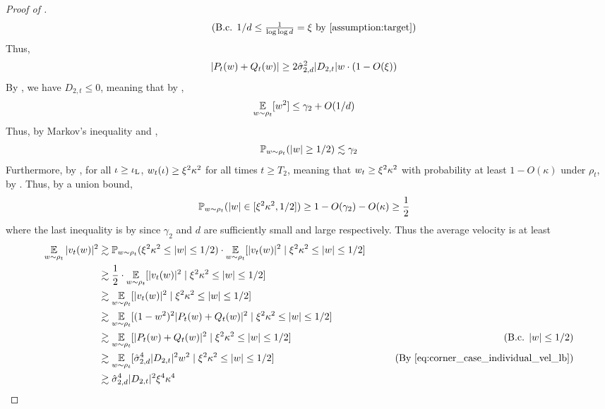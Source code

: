 \begin{proof}[Proof of ]
\begin{align}
& \tag{B.c. $1/d \leq \frac{1}{\log \log d} = \xi$ by \Cref{assumption:target}}
\end{align}
Thus,
\begin{align} \label{eq:corner_case_individual_vel_lb}
|P_t(w) + Q_t(w)|
& \geq 2 \hat{\sigma}_{2, d}^2 |D_{2, t}| w \cdot (1 - O(\xi))
\end{align}
By , we have $D_{2, t} \leq 0$, meaning that by ,
\begin{align}
\operatorname*{\mathbb{E}}_{w \sim \rho_t}[w^2] 
& \leq \gamma_2 + O(1/d)
\end{align}
Thus, by Markov's inequality and ,
\begin{align}
\mathbb{P}_{w \sim \rho_t}(|w| \geq 1/2) 
\lesssim \gamma_2
\end{align}
Furthermore, by , for all $\iota \geq \iota_{\textup{L}}$, $w_t(\iota) \geq \xi^2 \kappa^2$ for all times $t \geq T_2$, meaning that $w_t \geq \xi^2 \kappa^2$ with probability at least $1 - O(\kappa)$ under $\rho_t$, by . Thus, by a union bound,
\begin{align}
\mathbb{P}_{w \sim \rho_t}(|w| \in [\xi^2 \kappa^2, 1/2])
& \geq 1 - O(\gamma_2) - O(\kappa) \geq \frac{1}{2}
\end{align}
where the last inequality is by  since $\gamma_2$ and $d$ are sufficiently small and large respectively. Thus the average velocity is at least
\begin{align}
\E_{\w \sim \rho_t} |\vel_t(\w)|^2
& \gtrsim \Prob_{\w \sim \rho_t}(\xi^2 \kappa^2 \leq |\w| \leq 1/2) \cdot \E_{\w \sim \rho_t} [|\vel_t(\w)|^2 \mid \xi^2 \kappa^2 \leq |\w| \leq 1/2] \\
& \gtrsim \frac{1}{2} \cdot \E_{\w \sim \rho_t} [|\vel_t(\w)|^2 \mid \xi^2 \kappa^2 \leq |\w| \leq 1/2] \\
& \gtrsim \E_{\w \sim \rho_t} [|\vel_t(\w)|^2 \mid \xi^2 \kappa^2 \leq |\w| \leq 1/2] \\
& \gtrsim \E_{\w \sim \rho_t} [(1 - \w^2)^2 |P_t(\w) + Q_t(\w)|^2 \mid \xi^2 \kappa^2 \leq |\w| \leq 1/2] \\
& \gtrsim \E_{\w \sim \rho_t} [|P_t(\w) + Q_t(\w)|^2 \mid 
\xi^2 \kappa^2 \leq |\w| \leq 1/2]
& \tag{B.c. $|\w| \leq 1/2$} \\
& \gtrsim \E_{\w \sim \rho_t} [\sigmaCoeffTwo^4 |D_{2, t}|^2 \w^2 \mid \xi^2 \kappa^2 \leq |\w| \leq 1/2]
& \tag{By \Cref{eq:corner_case_individual_vel_lb}} \\
& \gtrsim \sigmaCoeffTwo^4 |D_{2, t}|^2 \xi^4 \kappa^4

\end{align}
\end{proof}
